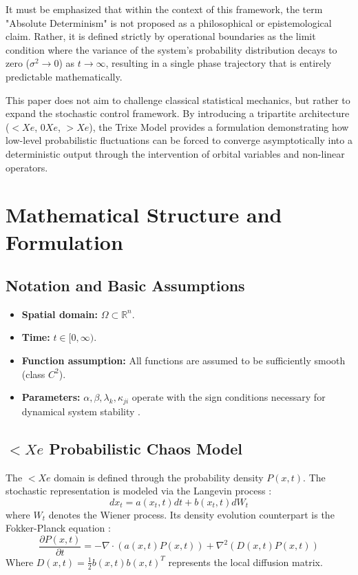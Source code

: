 \documentclass[12pt, a4paper]{article}
\begin{document}
It must be emphasized that within the context of this framework, the term "Absolute Determinism" is not proposed as a philosophical or epistemological claim. Rather, it is defined strictly by operational boundaries as the limit condition where the variance of the system's probability distribution decays to zero ($\sigma^2 \to 0$) as $t \to \infty$, resulting in a single phase trajectory that is entirely predictable mathematically.

This paper does not aim to challenge classical statistical mechanics, but rather to expand the stochastic control framework. By introducing a tripartite architecture ($<Xe$, $0Xe$, $>Xe$), the Trixe Model provides a formulation demonstrating how low-level probabilistic fluctuations can be forced to converge asymptotically into a deterministic output through the intervention of orbital variables and non-linear operators.

\section{Mathematical Structure and Formulation}

\subsection{Notation and Basic Assumptions}
\begin{itemize}
    \item \textbf{Spatial domain:} $\Omega\subset \mathbb{R}^{n}$.
    \item \textbf{Time:} $t\in[0,\infty)$.
    \item \textbf{Function assumption:} All functions are assumed to be sufficiently smooth (class $C^{2}$).
    \item \textbf{Parameters:} $\alpha, \beta, \lambda_{k}, \kappa_{ji}$ operate with the sign conditions necessary for dynamical system stability \cite{guckenheimer1983}.
\end{itemize}

\subsection{$<Xe$ Probabilistic Chaos Model}
The $<Xe$ domain is defined through the probability density $P(x,t)$. The stochastic representation is modeled via the Langevin process \cite{langevin1908, lemongythiel1997}: 
\begin{equation}
dx_{t}=a(x_{t},t)dt+b(x_{t},t)dW_{t}
\end{equation}
where $W_{t}$ denotes the Wiener process. Its density evolution counterpart is the Fokker-Planck equation \cite{risken1989}:
\begin{equation}
\frac{\partial P(x,t)}{\partial t}=-\nabla \cdot(a(x,t)P(x,t))+\nabla^{2}(D(x,t)P(x,t))
\end{equation}
Where $D(x,t)=\frac{1}{2}b(x,t)b(x,t)^{T}$ represents the local diffusion matrix.
\end{document}
